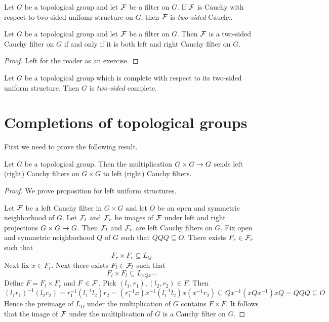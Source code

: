 \documentclass[10pt]{amsart}
\begin{document}
\begin{definition}
	Let $G$ be a topological group and let ${\mathcal F}$ be a filter on $G$. If ${\mathcal F}$ is Cauchy with respect to two-sided unifomr structure on $G$, then ${\mathcal F}$ is \textit{two-sided} Cauchy.
\end{definition}

\begin{fact}\label{fact:two_sided_Cauchy_filters}
	Let $G$ be a topological group and let ${\mathcal F}$ be a filter on $G$. Then ${\mathcal F}$ is a two-sided Cauchy filter on $G$ if and only if it is both left and right Cauchy filter on $G$.
\end{fact}
\begin{proof}
	Left for the reader as an exercise.
\end{proof}

\begin{definition}
	Let $G$ be a topological group which is complete with respect to its two-sided uniform structure. Then $G$ is \textit{two-sided} complete.
\end{definition}

\section{Completions of topological groups}
\noindent
First we need to prove the following result.

\begin{proposition}\label{proposition:multiplication_preserves_one_sided_Cauchy_filters}
	Let $G$ be a topological group. Then the multiplication $G\times G\rightarrow G$ sends left (right) Cauchy filters on $G\times G$ to left (right) Cauchy filters.
\end{proposition}
\begin{proof}
	We prove proposition for left uniform structures.

	Let ${\mathcal F}$ be a left Cauchy filter in $G\times G$ and let $O$ be an open and symmetric neighborhood of $G$. Let ${\mathcal F}_l$ and ${\mathcal F}_r$ be images of ${\mathcal F}$ under left and right projections $G\times G\rightarrow G$. Then ${\mathcal F}_l$ and ${\mathcal F}_r$ are left Cauchy filters on $G$. Fix open and symmetric neighborhood $Q$ of $G$ such that $QQQ \subseteq O$. There exists $F_r \in {\mathcal F}_r$ such that
	$$F_r \times F_r \subseteq L_Q$$
	Next fix $x \in F_r$. Next there exists $F_l \in {\mathcal F}_l$ such that
	$$F_l\times F_l \subseteq L_{xQx^{-1}}$$
	Define $F = F_l\times F_r$ and $F \in {\mathcal F}$. Pick $(l_1,r_1),(l_2,r_2) \in F$. Then
	$$(l_1r_1)^{-1}(l_2r_2) = r_1^{-1}(l_1^{-1}l_2)r_2 = (r_1^{-1}x)x^{-1}(l_1^{-1}l_2)x(x^{-1}r_2) \subseteq Qx^{-1}\left(xQx^{-1}\right)xQ = QQQ \subseteq O$$
	Hence the preimage of $L_O$ under the multiplication of $G$ contains $F \times F$. It follows that the image of ${\mathcal F}$ under the multiplication of $G$ is a Cauchy filter on $G$.
\end{proof}
\end{document}
